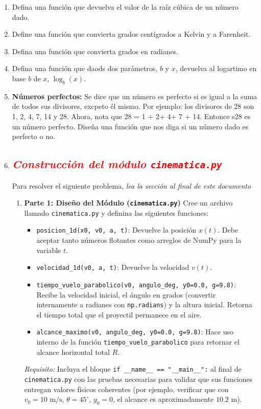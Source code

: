 \documentclass[12pt]{article}
\begin{document}
\begin{problemas}[]
\begin{enumerate}[leftmargin=*]

\item Defina una función que devuelva el valor de la
raíz cúbica de un número dado.
\item Define una función que convierta grados centígrados
a Kelvin y a Farenheit. 
\item Defina una función que convierta grados en radianes.
\item Defina una función que daods dos parámetros, $b$ y $x$,
devuelva al logartimo en base $b$ de $x$, $\log_b(x)$. 
\item \textbf{Números perfectos:}
Se dice que un número es perfecto si es igual a la suma
de todos sus divisores, excpeto él mismo. Por ejemplo:
los divisores de 28 son 1, 2, 4, 7, 14 y 28. 
Ahora, nota que 28 = 1 + 2+ 4+ 7 + 14. Entonce s28 
es un número perfecto. Diseña una función que nos
diga si un número dado es perfecto o no.

\item \subsection*{\textcolor{red}{\textit{Construcción del módulo \texttt{cinematica.py}}}}

Para resolver el siguiente problema, 
\textit{lea la sección al final de este documento}

\begin{enumerate}
    \item \textbf{Parte 1: Diseño del Módulo (\texttt{cinematica.py})}
    Cree un archivo llamado \texttt{cinematica.py} y definina 
    las siguientes funciones:
    \begin{itemize}
        \item \lstinline|posicion_1d(x0, v0, a, t)|: Devuelve la posición $x(t)$. 
        Debe aceptar tanto números flotantes como arreglos de \textsf{NumPy} para 
        la variable $t$.
        \item \lstinline|velocidad_1d(v0, a, t)|: Devuelve la velocidad $v(t)$.
        \item \lstinline|tiempo_vuelo_parabolico(v0, angulo_deg, y0=0.0, g=9.8)|: 
        Recibe la velocidad inicial, el ángulo en grados (convertir internamente a radianes 
        con \lstinline|np.radians|) y la altura inicial. 
        Retorna el tiempo total que el proyectil permanece en el aire.
        \item \lstinline|alcance_maximo(v0, angulo_deg, y0=0.0, g=9.8)|: Hace uso interno de la función \lstinline|tiempo_vuelo_parabolico| para retornar el alcance horizontal total $R$.
    \end{itemize}
    \textit{Requisito:} Incluya el bloque \lstinline|if __name__ == "__main__":| al final 
    de \texttt{cinematica.py} con las pruebas necesarias para validar que sus funciones 
    entregan valores físicos coherentes 
    (por ejemplo, verificar que con $v_0 = 10\text{ m/s}$, 
    $\theta = 45^\circ$, $y_0 = 0$, el alcance es aproximadamente $10.2\text{ m}$).


\end{enumerate}
\end{enumerate}
\end{problemas}
\end{document}
